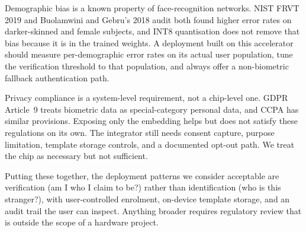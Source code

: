 Demographic bias is a known property of face-recognition networks. NIST FRVT 2019 and Buolamwini and Gebru's 2018 audit both found higher error rates on darker-skinned and female subjects, and INT8 quantisation does not remove that bias because it is in the trained weights. A deployment built on this accelerator should measure per-demographic error rates on its actual user population, tune the verification threshold to that population, and always offer a non-biometric fallback authentication path.

Privacy compliance is a system-level requirement, not a chip-level one. GDPR Article~9 treats biometric data as special-category personal data, and CCPA has similar provisions. Exposing only the embedding helps but does not satisfy these regulations on its own. The integrator still needs consent capture, purpose limitation, template storage controls, and a documented opt-out path. We treat the chip as necessary but not sufficient.

Putting these together, the deployment patterns we consider acceptable are verification (am I who I claim to be?) rather than identification (who is this stranger?), with user-controlled enrolment, on-device template storage, and an audit trail the user can inspect. Anything broader requires regulatory review that is outside the scope of a hardware project.
